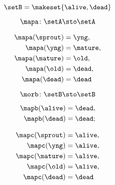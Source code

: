 \begin{forslides}
        
         \begin{equation}
            \label{eq:semicats-slides-79}
            \setB = \makeset{ \alive, \dead }
        \end{equation}
        
        
         \begin{equation}
            \label{eq:semicats-slides-80}
            \mapa \colon \setA \sto \setA
        \end{equation}
        
        
         \begin{equation}
            \label{eq:semicats-slides-81}
            \begin{aligned}
            \mapa(\sprout) & =  \yng, \\
            \mapa(\yng)    & =  \mature, \\
            \mapa(\mature) & =  \old, \\
            \mapa( \old)   & = \dead, \\
            \mapa(\dead)   & = \dead
        \end{aligned}
        \end{equation}
        
        
         \begin{equation}
            \label{eq:semicats-slides-82}
            \morb \colon \setB \sto \setB
        \end{equation}
        
        
         \begin{equation}
            \label{eq:semicats-slides-83}
            \begin{aligned}
            \mapb(\alive) & =  \dead, \\
            \mapb(\dead)  & =  \dead;
        \end{aligned}
        \end{equation}
        
        
         \begin{equation}
            \label{eq:semicats-slides-84}
            \begin{aligned}
            \mapc(\sprout) & = \alive, \\
            \mapc(\yng)    & =  \alive, \\
            \mapc(\mature) & = \alive , \\
            \mapc( \old)   & = \alive, \\
            \mapc (\dead)  & = \dead
        \end{aligned}
        \end{equation}
        

\end{forslides}
